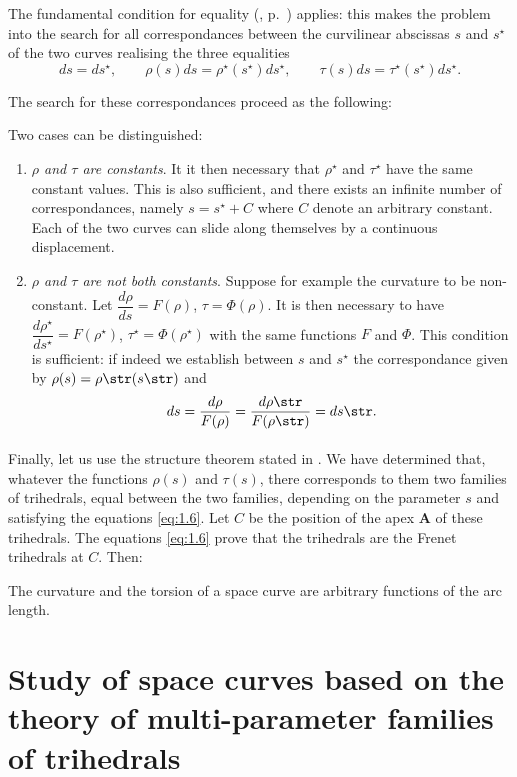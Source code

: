 The fundamental condition for equality (, p.~\pageref{sec:7}) applies: this makes the problem into the search for all correspondances between the curvilinear abscissas $s$ and $s^{\star}$ of the two curves realising the three equalities
\[
ds=ds^{\star},\qquad\rho(s)ds=\rho^{\star}(s^{\star})ds^{\star},\qquad\tau(s)ds=\tau^{\star}(s^{\star})ds^{\star}.
\]

The search for these correspondances proceed as the following:

Two cases can be distinguished:
\begin{enumerate}
\item \emph{$\rho$ and $\tau$ are constants}. It it then necessary that $\rho^{\star}$ and $\tau^{\star}$ have the same constant values. This is also sufficient, and there exists an infinite number of correspondances, namely $s=s^{\star}+C$ where $C$ denote an arbitrary constant. Each of the two curves can slide along themselves by a continuous displacement.
\item \emph{$\rho$ and $\tau$ are not both constants}. Suppose for example the curvature to be non-constant. Let $\dfrac{d\rho}{ds}=F(\rho)$, $\tau=\Phi(\rho)$. It is then necessary to have $\dfrac{d\rho^{\star}}{ds^{\star}}=F(\rho^{\star})$, $\tau^{\star}=\Phi(\rho^{\star})$ with the same functions $F$ and $\Phi$. This condition is sufficient: if indeed we establish between $s$ and $s^{\star}$ the correspondance given by $\rho(s)=\rho\str(s\str)$ and
\[
ds=\frac{d\rho}{F(\rho)}=\frac{d\rho\str}{F(\rho\str)}=ds\str.
\]
\end{enumerate}

\paragraph{}
\label{sec:14}
Finally, let us use the structure theorem stated in . We have determined that, whatever the functions $\rho(s)$ and $\tau(s)$, there corresponds to them two families of trihedrals, equal between the two families, depending on the parameter $s$ and satisfying the equations \eqref{eq:1.6}. Let $C$ be the position of the apex $\mathbf{A}$ of these trihedrals. The equations \eqref{eq:1.6} prove that the trihedrals are the Frenet trihedrals at $C$. Then:
\begin{strthm}
  The curvature and the torsion of a space curve are arbitrary functions of the arc length.
\end{strthm}


\section{Study of space curves based on the theory of multi-parameter families of trihedrals}
\label{sec:study-space-curves}

